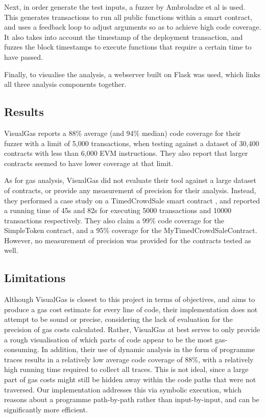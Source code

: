 Next, in order generate the test inputs, a fuzzer by Ambroladze et al \cite{visualgas_fuzzer} is used. This generates 
transactions to run all public functions within a smart contract, and uses a feedback loop to adjust
arguments so as to achieve high code coverage. It also takes into account the timestamp of the deployment
transaction, and fuzzes the block timestamps to execute functions that require a certain time to have passed.


Finally, to visualise the analysis, a webserver built on Flask was used, which links all three
analysis components together.

\subsection{Results}
VisualGas reports a 88\% average (and 94\% median) code coverage for their fuzzer with a limit of 
5,000 transactions, when testing against a dataset of 30,400 contracts with less than 6,000 EVM
instructions. They also report that larger contracts seemed to have lower coverage at that limit.

As for gas analysis, VisualGas did not evaluate their tool against a large dataset of contracts,
or provide any measurement of precision for their analysis. Instead, they performed a case study
on a TimedCrowdSale smart contract \cite{visualgas_timedcrowdsale}, and reported a running time 
of 45s and 82s for executing 5000 transactions and 10000 transactions respectively. They also 
claim a 99\% code coverage for the SimpleToken contract, and a 95\% coverage for the 
MyTimedCrowdSaleContract. However, no measurement of precision was provided for the contracts tested
as well.

\subsection{Limitations}
Although VisualGas is closest to this project in terms of objectives, and aims to produce a gas cost estimate 
for every line of code, their implementation
does not attempt to be sound or precise, considering the lack of evaluation for the precision 
of gas costs calculated. Rather, VisualGas at best serves to only provide a rough visualisation
of which parts of code appear to be the most gas-consuming. In addition, their use of dynamic 
analysis in the form of programme traces results in a relatively low average code coverage of 88\%, with a
relatively high running time required to collect all traces. This is not ideal, since a large part of
gas costs might still be hidden away within the code paths that were not traversed. Our implementation
addresses this via symbolic execution, which reasons about a programme path-by-path rather than 
input-by-input, and can be significantly more efficient.

